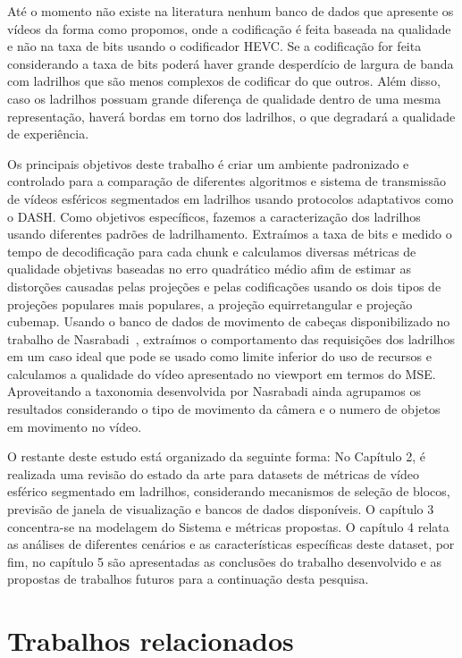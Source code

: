 Até o momento não existe na literatura nenhum banco de dados que apresente os vídeos da forma como propomos, onde a codificação é feita baseada na qualidade e não na taxa de bits usando o codificador HEVC. Se a codificação for feita considerando a taxa de bits poderá haver grande desperdício de largura de banda com ladrilhos que são menos complexos de codificar do que outros. Além disso, caso os ladrilhos possuam grande diferença de qualidade dentro de uma mesma representação, haverá bordas em torno dos ladrilhos, o que degradará a qualidade de experiência.

Os principais objetivos deste trabalho é criar um ambiente padronizado e controlado para a comparação de diferentes algoritmos e sistema de transmissão de vídeos esféricos segmentados em ladrilhos usando protocolos adaptativos como o DASH. Como objetivos específicos, fazemos a caracterização dos ladrilhos usando diferentes padrões de ladrilhamento. Extraímos a taxa de bits e medido o tempo de decodificação para cada chunk e calculamos diversas métricas de qualidade objetivas baseadas no erro quadrático médio afim de estimar as distorções causadas pelas projeções e pelas codificações usando os dois tipos de projeções populares mais populares, a projeção equirretangular e projeção cubemap. Usando o banco de dados de movimento de cabeças disponibilizado no trabalho de Nasrabadi~\cite{Nasrabadi2019}, extraímos o comportamento das requisições dos ladrilhos em um caso ideal que pode se usado como limite inferior do uso de recursos e calculamos a qualidade do vídeo apresentado no viewport em termos do MSE. Aproveitando a taxonomia desenvolvida por Nasrabadi ainda agrupamos os resultados considerando o tipo de movimento da câmera e o numero de objetos em movimento no vídeo.

O restante deste estudo está organizado da seguinte forma: No Capítulo 2, é realizada uma revisão do estado da arte para datasets de métricas de vídeo esférico segmentado em ladrilhos, considerando mecanismos de seleção de blocos, previsão de janela de visualização e bancos de dados disponíveis. O capítulo 3 concentra-se na modelagem do Sistema e métricas propostas. O capítulo 4 relata as análises de diferentes cenários e as características específicas deste dataset, por fim, no capítulo 5 são apresentadas as conclusões do trabalho desenvolvido e as propostas de trabalhos futuros para a continuação desta pesquisa.


 \chapter{Trabalhos relacionados}


